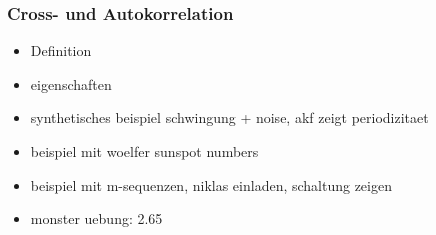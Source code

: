 \subsubsection{Cross- und Autokorrelation}\label{corr}

\begin{itemize}
    \item Definition
    \item eigenschaften
    \item synthetisches beispiel schwingung + noise, akf zeigt periodizitaet
    \item beispiel mit woelfer sunspot numbers
    \item beispiel mit m-sequenzen, niklas einladen, schaltung zeigen
    \item monster uebung: 2.65
\end{itemize}